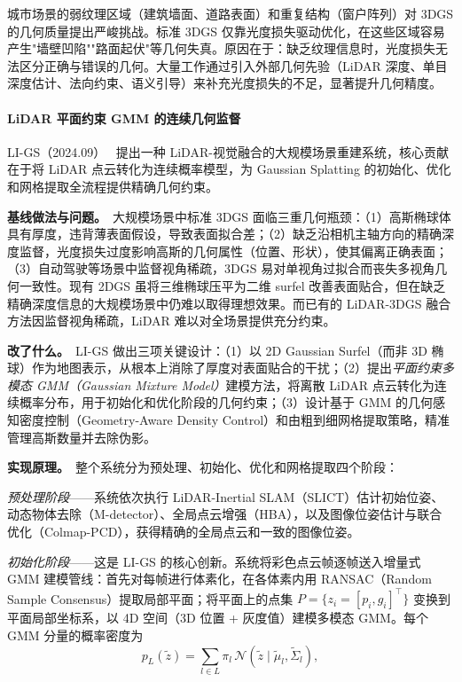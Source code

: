 城市场景的弱纹理区域（建筑墙面、道路表面）和重复结构（窗户阵列）对 3DGS 的几何质量提出严峻挑战。标准 3DGS 仅靠光度损失驱动优化，在这些区域容易产生"墙壁凹陷""路面起伏"等几何失真。原因在于：缺乏纹理信息时，光度损失无法区分正确与错误的几何。大量工作通过引入外部几何先验（LiDAR 深度、单目深度估计、法向约束、语义引导）来补充光度损失的不足，显著提升几何精度。

\paragraph{LiDAR 平面约束 GMM 的连续几何监督}

LI-GS（2024.09）~\cite{2409_12899} 提出一种 LiDAR-视觉融合的大规模场景重建系统，核心贡献在于将 LiDAR 点云转化为连续概率模型，为 Gaussian Splatting 的初始化、优化和网格提取全流程提供精确几何约束。

\textbf{基线做法与问题。}~大规模场景中标准 3DGS 面临三重几何瓶颈：（1）高斯椭球体具有厚度，违背薄表面假设，导致表面拟合差；（2）缺乏沿相机主轴方向的精确深度监督，光度损失过度影响高斯的几何属性（位置、形状），使其偏离正确表面；（3）自动驾驶等场景中监督视角稀疏，3DGS 易对单视角过拟合而丧失多视角几何一致性。现有 2DGS 虽将三维椭球压平为二维 surfel 改善表面贴合，但在缺乏精确深度信息的大规模场景中仍难以取得理想效果。而已有的 LiDAR-3DGS 融合方法因监督视角稀疏，LiDAR 难以对全场景提供充分约束。

\textbf{改了什么。}~LI-GS 做出三项关键设计：（1）以 2D Gaussian Surfel（而非 3D 椭球）作为地图表示，从根本上消除了厚度对表面贴合的干扰；（2）提出\emph{平面约束多模态 GMM（Gaussian Mixture Model）}建模方法，将离散 LiDAR 点云转化为连续概率分布，用于初始化和优化阶段的几何约束；（3）设计基于 GMM 的几何感知密度控制（Geometry-Aware Density Control）和由粗到细网格提取策略，精准管理高斯数量并去除伪影。

\textbf{实现原理。}~整个系统分为预处理、初始化、优化和网格提取四个阶段：

\emph{预处理阶段}——系统依次执行 LiDAR-Inertial SLAM（SLICT）估计初始位姿、动态物体去除（M-detector）、全局点云增强（HBA），以及图像位姿估计与联合优化（Colmap-PCD），获得精确的全局点云和一致的图像位姿。

\emph{初始化阶段}——这是 LI-GS 的核心创新。系统将彩色点云帧逐帧送入增量式 GMM 建模管线：首先对每帧进行体素化，在各体素内用 RANSAC（Random Sample Consensus）提取局部平面；将平面上的点集 $P = \{z_i = [p_i, g_i]^\top\}$ 变换到平面局部坐标系，以 4D 空间（3D 位置 + 灰度值）建模多模态 GMM。每个 GMM 分量的概率密度为
\begin{equation}
    p_L(\tilde{z}) = \sum_{l \in L} \pi_l \, \mathcal{N}(\tilde{z} \mid \tilde{\mu}_l, \tilde{\Sigma}_l),
\end{equation}

